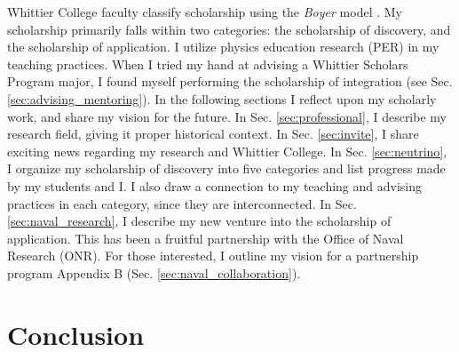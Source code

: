 \documentclass[../../main.tex]{subfiles}
\begin{document}
\label{sec:scholarship}

Whittier College faculty classify scholarship using the \textit{Boyer} model \cite{boyer}.  My scholarship primarily falls within two categories: the scholarship of discovery, and the scholarship of application.  I utilize physics education research (PER) in my teaching practices.  When I tried my hand at advising a Whittier Scholars Program major, I found myself performing the scholarship of integration (see Sec. \ref{sec:advising_mentoring}).  In the following sections I reflect upon my scholarly work, and share my vision for the future.  In Sec. \ref{sec:professional}, I describe my research field, giving it proper historical context.  In Sec. \ref{sec:invite}, I share exciting news regarding my research and Whittier College.  In Sec. \ref{sec:neutrino}, I organize my scholarship of discovery into five categories and list progress made by my students and I.  I also draw a connection to my teaching and advising practices in each category, since they are interconnected.  In Sec. \ref{sec:naval_research}, I describe my new venture into the scholarship of application.  This has been a fruitful partnership with the Office of Naval Research (ONR).  For those interested, I outline my vision for a partnership program Appendix B (Sec. \ref{sec:naval_collaboration}).

\begin{flushleft}

\end{flushleft}

\begin{flushleft}

\end{flushleft}

\begin{flushleft}

\end{flushleft}

%

\section{Conclusion}
\end{document}
